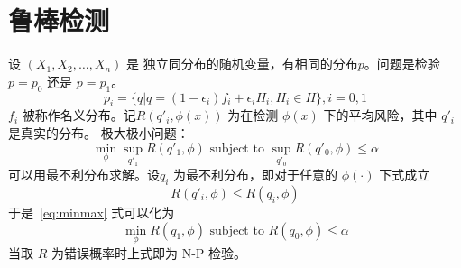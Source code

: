 \documentclass{ctexart}
\numberwithin{equation}{section}
\begin{document}
\section{鲁棒检测}
设 $ (X_1, X_2, \dots, X_n) $ 是 独立同分布的随机变量，有相同的分布$p$。问题是检验 $ p = p_0 $ 还是 $ p = p_1 $。
$$
 p_i = \{ q | q = (1-\epsilon_i) f_i + \epsilon_i H_i , H_i \in H \}, i = 0,1
$$
$f_i$ 被称作名义分布。记$ R(q'_i, \phi(x)) $ 为在检测 $\phi(x)$ 下的平均风险，其中 $ q'_i $ 是真实的分布。
极大极小问题：
\begin{equation}\label{eq:minmax}
\min_{\phi} \sup_{q'_1} R(q'_1, \phi) \textrm{ subject to } \sup_{q'_0} R(q'_0, \phi) \leq \alpha  
\end{equation}
可以用最不利分布求解。设$ q_i$ 为最不利分布，即对于任意的 $\phi(\cdot)$ 下式成立
$$
R(q'_i, \phi) \leq R(q_i, \phi)
$$
于是~\eqref{eq:minmax} 式可以化为
$$
\min_{\phi} R(q_1, \phi) \textrm{ subject to } R(q_0, \phi) \leq \alpha
$$
当取 $R$ 为错误概率时上式即为 N-P 检验。
\end{document}
